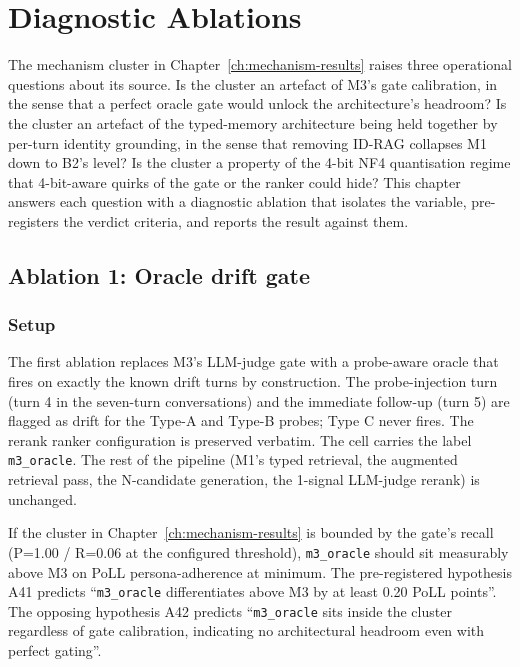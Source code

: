 \chapter{Diagnostic Ablations}
\label{ch:ablations}

The mechanism cluster in Chapter~\ref{ch:mechanism-results} raises three operational questions about its source. Is the cluster an artefact of M3's gate calibration, in the sense that a perfect oracle gate would unlock the architecture's headroom? Is the cluster an artefact of the typed-memory architecture being held together by per-turn identity grounding, in the sense that removing ID-RAG collapses M1 down to B2's level? Is the cluster a property of the 4-bit NF4 quantisation regime that 4-bit-aware quirks of the gate or the ranker could hide? This chapter answers each question with a diagnostic ablation that isolates the variable, pre-registers the verdict criteria, and reports the result against them.

\section{Ablation 1: Oracle drift gate}
\label{sec:oracle-gate}

\subsection{Setup}

The first ablation replaces M3's LLM-judge gate with a probe-aware oracle that fires on exactly the known drift turns by construction. The probe-injection turn (turn 4 in the seven-turn conversations) and the immediate follow-up (turn 5) are flagged as drift for the Type-A and Type-B probes; Type C never fires. The rerank ranker configuration is preserved verbatim. The cell carries the label \texttt{m3\_oracle}. The rest of the pipeline (M1's typed retrieval, the augmented retrieval pass, the N-candidate generation, the 1-signal LLM-judge rerank) is unchanged.

If the cluster in Chapter~\ref{ch:mechanism-results} is bounded by the gate's recall (P=1.00 / R=0.06 at the configured threshold), \texttt{m3\_oracle} should sit measurably above M3 on PoLL persona-adherence at minimum. The pre-registered hypothesis A41 predicts ``\texttt{m3\_oracle} differentiates above M3 by at least 0.20 PoLL points''. The opposing hypothesis A42 predicts ``\texttt{m3\_oracle} sits inside the cluster regardless of gate calibration, indicating no architectural headroom even with perfect gating''.

